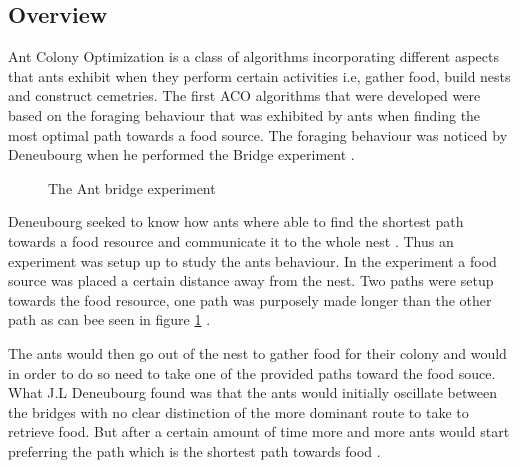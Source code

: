 \subsection{Overview}
Ant Colony Optimization is a class of algorithms incorporating different aspects that ants exhibit when they perform certain activities i.e, gather food, build nests and construct cemetries. The first ACO algorithms that were developed were based on the foraging behaviour that was exhibited by ants when finding the most optimal path towards a food source. The foraging behaviour was noticed by Deneubourg when he performed the Bridge experiment \cite{AntsAndStigmergy,CompuIntelligenceIntro}.
\begin{figure}[b!]
	\centering
	\setlength \fboxsep{0pt}
	\setlength \fboxrule{0.5pt}
	\caption{The Ant bridge experiment \cite{AntsAndStigmergy}}
	\label{fig:antBridgeExperiment}
\end{figure}

Deneubourg seeked to know how ants where able to find the shortest path towards a food resource and communicate it to the whole nest \cite{AntsAndStigmergy}. Thus an experiment was setup up to study the ants behaviour. In the experiment a food source was placed a certain distance away from the nest. Two paths were setup towards the food resource, one path was purposely made longer than the other path as can bee seen in figure \ref{fig:antBridgeExperiment} \cite{AntsAndStigmergy}.

The ants would then go out of the nest to gather food for their colony and would in order to do so need to take one of the provided paths toward the food souce. What J.L Deneubourg found was that the ants would initially oscillate between the bridges with no clear distinction of the more dominant route to take to retrieve food. But after a certain amount of time more and more ants would start preferring the path which is the shortest path towards food \cite{AntsAndStigmergy}.

